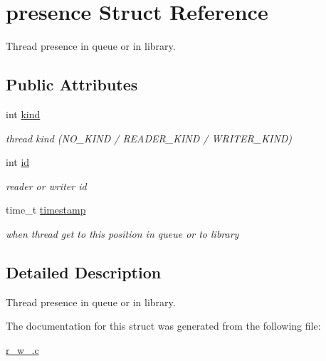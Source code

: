 \hypertarget{structpresence}{}\section{presence Struct Reference}
\label{structpresence}


Thread presence in queue or in library.  


\subsection*{Public Attributes}
\begin{DoxyCompactItemize}
\item 
\mbox{\label{structpresence_af4978d98a4de0838f7ce391a517cc627}} 
int \hyperlink{structpresence_af4978d98a4de0838f7ce391a517cc627}{kind}
\begin{DoxyCompactList}\small\item\em thread kind (N\+O\+\_\+\+K\+I\+ND / R\+E\+A\+D\+E\+R\+\_\+\+K\+I\+ND / W\+R\+I\+T\+E\+R\+\_\+\+K\+I\+ND) \end{DoxyCompactList}\item 
\mbox{\label{structpresence_a1f789aa45f1edb5299a5c617d5a0a600}} 
int \hyperlink{structpresence_a1f789aa45f1edb5299a5c617d5a0a600}{id}
\begin{DoxyCompactList}\small\item\em reader or writer id \end{DoxyCompactList}\item 
\mbox{\label{structpresence_a6b359501553b759c90dce396d7f36a3d}} 
time\+\_\+t \hyperlink{structpresence_a6b359501553b759c90dce396d7f36a3d}{timestamp}
\begin{DoxyCompactList}\small\item\em when thread get to this position in queue or to library \end{DoxyCompactList}\end{DoxyCompactItemize}


\subsection{Detailed Description}
Thread presence in queue or in library. 

The documentation for this struct was generated from the following file\+:\begin{DoxyCompactItemize}
\item 
\hyperlink{r__w__2_8c}{r\+\_\+w\+\_.\+c}\end{DoxyCompactItemize}

